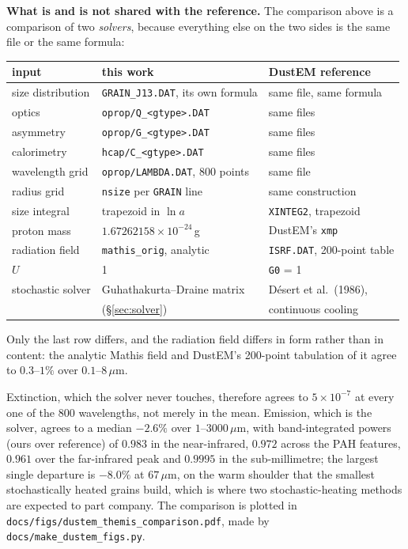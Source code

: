 \documentclass{my_memo}
\newcommand{\code}[1]{\texttt{#1}}
\newcommand{\um}{\ensuremath{\,\mu\mathrm{m}}}
\begin{document}
\medskip
\noindent \textbf{What is and is not shared with the reference.} The comparison
above is a comparison of two \emph{solvers}, because everything else on the two
sides is the same file or the same formula:

\begin{table}[h]
\centering
\begin{tabular}{@{}lll@{}}
\toprule
input & this work & DustEM reference \\
\midrule
size distribution & \code{GRAIN\_J13.DAT}, its own formula & same file, same formula \\
optics            & \code{oprop/Q\_<gtype>.DAT}            & same files \\
asymmetry         & \code{oprop/G\_<gtype>.DAT}            & same files \\
calorimetry       & \code{hcap/C\_<gtype>.DAT}             & same files \\
wavelength grid   & \code{oprop/LAMBDA.DAT}, 800 points    & same file \\
radius grid       & \code{nsize} per \code{GRAIN} line     & same construction \\
size integral     & trapezoid in $\ln a$                   & \code{XINTEG2}, trapezoid \\
proton mass       & $1.67262158\times10^{-24}$\,g          & DustEM's \code{xmp} \\
radiation field   & \code{mathis\_orig}, analytic          & \code{ISRF.DAT}, 200-point table \\
$U$               & 1                                     & \code{G0} = 1 \\
\midrule
stochastic solver & Guhathakurta--Draine matrix           & D\'esert et al.\ (1986), \\
                  & (\S\ref{sec:solver})                  & continuous cooling \\
\bottomrule
\end{tabular}
\end{table}

\noindent Only the last row differs, and the radiation field differs in form
rather than in content: the analytic Mathis field and DustEM's 200-point
tabulation of it agree to $0.3$--$1\%$ over $0.1$--$8$\um.

Extinction, which the solver never touches, therefore agrees to
$5\times10^{-7}$ at every one of the 800 wavelengths, not merely in the mean.
Emission, which is the solver, agrees to a median $-2.6\%$ over
$1$--$3000$\um, with band-integrated powers (ours over reference) of $0.983$ in
the near-infrared, $0.972$ across the PAH features, $0.961$ over the
far-infrared peak and $0.9995$ in the sub-millimetre; the largest single
departure is $-8.0\%$ at $67$\um, on the warm shoulder that the smallest
stochastically heated grains build, which is where two stochastic-heating
methods are expected to part company. The comparison is plotted in
\code{docs/figs/dustem\_themis\_comparison.pdf}, made by
\code{docs/make\_dustem\_figs.py}.
\end{document}
